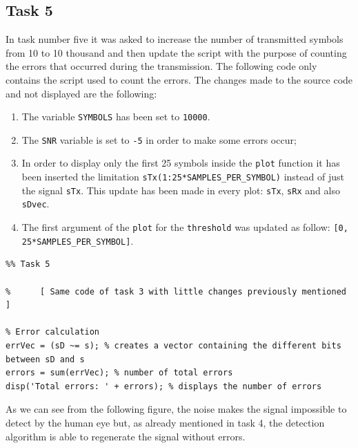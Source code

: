 % 
\subsection*{Task 5}
In task number five it was asked to increase the number of transmitted symbols from 10 to 10 thousand and then update the script with the purpose of counting the errors that occurred during the transmission. The following code only contains the script used to count the errors. The changes made to the source code and not displayed are the following:
\vspace{-5px}
\begin{enumerate}
\setlength{\itemsep}{-2px}
    \item The variable \texttt{SYMBOLS} has been set to \texttt{10000}.
    \item The \texttt{SNR} variable is set to \texttt{-5} in order to make some errors occur;
    \item In order to display only the first 25 symbols inside the \texttt{plot} function it has been inserted the limitation \texttt{sTx(1:25*SAMPLES\_PER\_SYMBOL)} instead of just the signal \texttt{sTx}. This update has been made in every plot: \texttt{sTx}, \texttt{sRx} and also \texttt{sDvec}.
    \item The first argument of the \texttt{plot} for the \texttt{threshold} was updated as follow: \texttt{[0, 25*SAMPLES\_PER\_SYMBOL]}.
\end{enumerate}
\vspace{-5px}

\begin{lstlisting}
%% Task 5

%      [ Same code of task 3 with little changes previously mentioned ] 

% Error calculation
errVec = (sD ~= s); % creates a vector containing the different bits between sD and s
errors = sum(errVec); % number of total errors
disp('Total errors: ' + errors); % displays the number of errors
\end{lstlisting}


\vspace{10px}\noindent As we can see from the following figure, the noise makes the signal impossible to detect by the human eye but, as already mentioned in task 4, the detection algorithm is able to regenerate the signal without errors.

